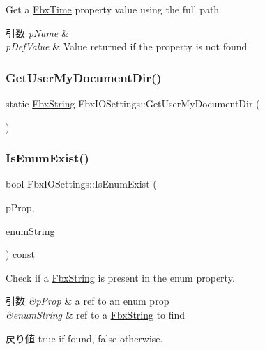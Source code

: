 Get a \hyperlink{class_fbx_time}{Fbx\+Time} property value using the full path 
\begin{DoxyParams}{引数}
{\em p\+Name} & \\
\hline
{\em p\+Def\+Value} & Value returned if the property is not found \\
\hline
\end{DoxyParams}
\mbox{\label{class_fbx_i_o_settings_a6ddfd3af6a5f6974d4bd3cd6b5315fd6}} 
\subsubsection{\texorpdfstring{Get\+User\+My\+Document\+Dir()}{GetUserMyDocumentDir()}}
{\footnotesize\ttfamily static \hyperlink{class_fbx_string}{Fbx\+String} Fbx\+I\+O\+Settings\+::\+Get\+User\+My\+Document\+Dir (\begin{DoxyParamCaption}{ }\end{DoxyParamCaption})\hspace{0.3cm}{\ttfamily [static]}}

\mbox{\label{class_fbx_i_o_settings_a8276b09f853df8e836a9760fd8f8cbfb}} 
\subsubsection{\texorpdfstring{Is\+Enum\+Exist()}{IsEnumExist()}}
{\footnotesize\ttfamily bool Fbx\+I\+O\+Settings\+::\+Is\+Enum\+Exist (\begin{DoxyParamCaption}\item[{\hyperlink{class_fbx_property}{Fbx\+Property} \&}]{p\+Prop,  }\item[{const \hyperlink{class_fbx_string}{Fbx\+String} \&}]{enum\+String }\end{DoxyParamCaption}) const}

Check if a \hyperlink{class_fbx_string}{Fbx\+String} is present in the enum property. 
\begin{DoxyParams}{引数}
{\em \&p\+Prop} & a ref to an enum prop \\
\hline
{\em \&enum\+String} & ref to a \hyperlink{class_fbx_string}{Fbx\+String} to find \\
\hline
\end{DoxyParams}
\begin{DoxyReturn}{戻り値}
{\ttfamily true} if found, {\ttfamily false} otherwise. 
\end{DoxyReturn}
\mbox{\label{class_fbx_i_o_settings_a83350a45f6370913ca1b2c0527a07d8b}} 
